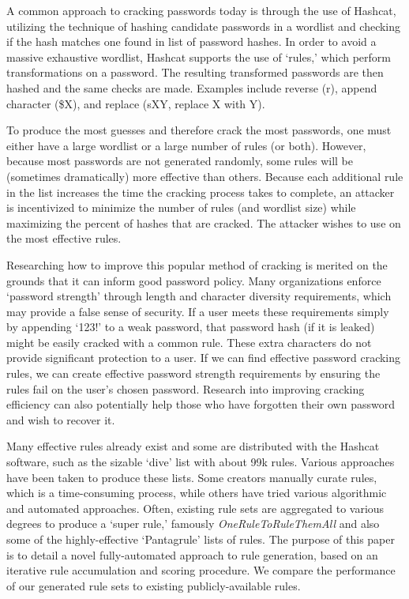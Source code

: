 \documentclass[letterpaper,twocolumn,10pt]{article}
\begin{document}
A common approach to cracking passwords today is through the use of Hashcat,
utilizing the technique of hashing candidate passwords in a wordlist and
checking if the hash matches one found in list of password hashes. In order to avoid a massive exhaustive
wordlist, Hashcat supports the use of `rules,' which perform
transformations on a password. The resulting transformed passwords are then hashed and the same
checks are made. Examples include reverse (r), append character (\$X), and
replace (sXY, replace X with Y).\cite{hashcat}


To produce the most guesses and therefore crack the most passwords, one must either have a large wordlist or a large number of rules (or both). However, because
most passwords are not generated randomly, some rules will be
(sometimes dramatically) more effective than others. Because each additional
rule in the list increases the time the cracking process takes to complete, an
attacker is incentivized to minimize the number of rules (and wordlist size) while maximizing the percent of hashes that are cracked. The attacker wishes to use on the most effective rules.

Researching how to improve this popular method of cracking
is merited on the grounds that it can inform good password policy.
Many organizations enforce `password strength' through
length and character diversity requirements, which may provide a false sense
of security. If a user meets these requirements simply by appending `123!' to a
weak password, that password hash (if it is leaked) might be easily cracked with
a common rule. These extra characters do not provide significant protection to a user.
If we can find effective password cracking rules, we can create effective password
strength requirements by ensuring the rules fail on the user's chosen password.
Research into improving cracking efficiency can also potentially help those
who have forgotten their own password and wish to recover it.


Many effective rules already exist and some are distributed with the
Hashcat software, such as the sizable `dive' list with about 99k rules. Various approaches have
been taken to produce these lists. Some creators manually curate rules, which
is a time-consuming process, while others have tried various algorithmic and
automated approaches. Often, existing rule sets are aggregated to various
degrees to produce a `super rule,' famously \textit{OneRuleToRuleThemAll} and
also some of the highly-effective `Pantagrule' lists of
rules.\cite{ortrta,pantagrule} The purpose of this paper is to detail a
novel fully-automated approach to rule generation, based on an iterative rule accumulation and scoring procedure. We compare the performance of our generated rule sets to existing publicly-available rules.
\end{document}
